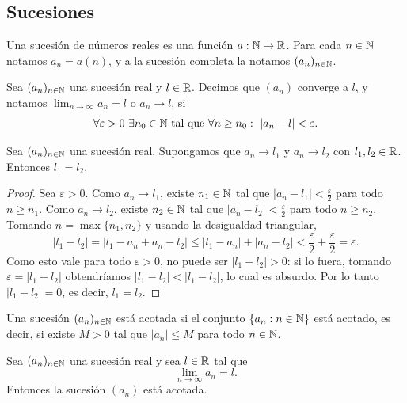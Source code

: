 \subsection{Sucesiones}

\begin{defi}[Sucesión]
Una sucesión de números reales es una función $a : \mathbb{N} \to \mathbb{R}$. Para cada $n \in \mathbb{N}$
notamos $a_n = a(n)$, y a la sucesión completa la notamos $(a_n)_{n\in\mathbb{N}}$.
\end{defi}

\begin{defi}
Sea $(a_n)_{n\in\mathbb{N}}$ una sucesión real y $l \in \mathbb{R}$. Decimos que $(a_n)$ converge a
$l$, y notamos $\lim_{n\to\infty} a_n = l$ o $a_n \to l$, si
\[
\forall \varepsilon > 0 \ \exists n_0 \in \mathbb{N} \ \text{tal que} \ \forall n \ge n_0:
\ |a_n - l| < \varepsilon.
\]
\end{defi}

\begin{prop}
Sea $(a_n)_{n\in\mathbb{N}}$ una sucesión real. Supongamos que $a_n \to l_1$ y $a_n \to l_2$
con $l_1, l_2 \in \mathbb{R}$. Entonces $l_1 = l_2$.
\end{prop}

\begin{proof}
Sea $\varepsilon > 0$. Como $a_n \to l_1$, existe $n_1 \in \mathbb{N}$ tal que
$|a_n - l_1| < \tfrac{\varepsilon}{2}$ para todo $n \ge n_1$. Como $a_n \to l_2$,
existe $n_2 \in \mathbb{N}$ tal que $|a_n - l_2| < \tfrac{\varepsilon}{2}$ para todo
$n \ge n_2$. Tomando $n = \max\{n_1, n_2\}$ y usando la desigualdad triangular,
\[
|l_1 - l_2| = |l_1 - a_n + a_n - l_2| \le |l_1 - a_n| + |a_n - l_2|
< \frac{\varepsilon}{2} + \frac{\varepsilon}{2} = \varepsilon.
\]
Como esto vale para todo $\varepsilon > 0$, no puede ser $|l_1 - l_2| > 0$: si lo
fuera, tomando $\varepsilon = |l_1 - l_2|$ obtendríamos $|l_1 - l_2| < |l_1 - l_2|$,
lo cual es absurdo. Por lo tanto $|l_1 - l_2| = 0$, es decir, $l_1 = l_2$.
\end{proof}

\begin{defi}
Una sucesión $(a_n)_{n\in\mathbb{N}}$ está acotada si el conjunto $\{a_n : n \in \mathbb{N}\}$ está
acotado, es decir, si existe $M > 0$ tal que $|a_n| \le M$ para todo $n \in \mathbb{N}$.
\end{defi}

\begin{prop}
Sea $(a_n)_{n\in\mathbb{N}}$ una sucesión real y sea $l \in \mathbb{R}$ tal que
\[
\lim_{n\to\infty} a_n = l.
\]
Entonces la sucesión $(a_n)$ está acotada.
\end{prop}

